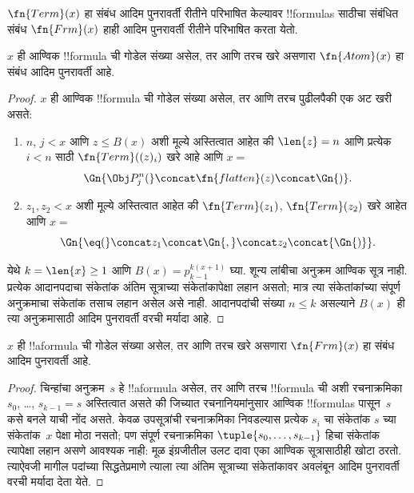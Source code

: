 \documentclass[../../../include/open-logic-section]{subfiles}
\begin{document}

$\fn{Term}(x)$ हा संबंध आदिम पुनरावर्ती रीतीने परिभाषित केल्यावर
!!{formula}s साठीचा संबंधित संबंध $\fn{Frm}(x)$ हाही आदिम
पुनरावर्ती रीतीने परिभाषित करता येतो.

\begin{prop}
$x$ ही आण्विक !!{formula} ची गोडेल संख्या असेल, तर आणि तरच
खरे असणारा $\fn{Atom}(x)$ हा संबंध आदिम पुनरावर्ती आहे.
\end{prop}

\begin{proof}
$x$ ही आण्विक !!{formula} ची गोडेल संख्या असेल, तर आणि तरच
पुढीलपैकी एक अट खरी असते:
\begin{enumerate}
\item $n$, $j < x$ आणि $z \le B(x)$ अशी मूल्ये अस्तित्वात आहेत की
  $\len{z}=n$ आणि प्रत्येक $i < n$ साठी $\fn{Term}((z)_i)$ खरे आहे आणि $x = $
\[
\Gn{\Obj P^n_j(} \concat \fn{flatten}(z) \concat \Gn{)}.
\]
\item $z_1, z_2 < x$ अशी मूल्ये अस्तित्वात आहेत की $\fn{Term}(z_1)$,
  $\fn{Term}(z_2)$ खरे आहेत आणि $x = $
\[
\Gn{{\eq}(} \concat z_1 \concat \Gn{,} \concat z_2 \concat{\Gn{)}}.
\]
\end{enumerate}
येथे $k=\len{x}\ge1$ आणि $B(x)=p_{k-1}^{k(x+1)}$ घ्या.
शून्य लांबीचा अनुक्रम आण्विक सूत्र नाही. प्रत्येक आदानपदाचा संकेतांक
अंतिम सूत्राच्या संकेतांकापेक्षा लहान असतो; मात्र त्या संकेतांकांच्या
संपूर्ण अनुक्रमाचा संकेतांक तसाच लहान असेल असे नाही. आदानपदांची
संख्या $n\le k$ असल्याने $B(x)$ ही त्या अनुक्रमासाठी आदिम पुनरावर्ती
वरची मर्यादा आहे.
\end{proof}

\begin{prop}
$x$ ही !!a{formula} ची गोडेल संख्या असेल, तर आणि तरच
खरे असणारा $\fn{Frm}(x)$ हा संबंध आदिम पुनरावर्ती आहे.
\end{prop}

\begin{proof}
चिन्हांचा अनुक्रम~$s$ हे !!a{formula} असेल, तर आणि तरच
!!{formula} ची अशी रचनाक्रमिका~$s_0$, \dots, $s_{k-1} = s$
अस्तित्वात असते की जिच्यात रचनानियमांनुसार आण्विक !!{formula}s
पासून~$s$ कसे बनले याची नोंद असते. केवळ उपसूत्रांची रचनाक्रमिका
निवडल्यास प्रत्येक $s_i$ चा संकेतांक
$s$ च्या संकेतांक~$x$ पेक्षा मोठा नसतो; पण संपूर्ण रचनाक्रमिका
$\tuple{s_0, \dots, s_{k-1}}$ हिचा संकेतांक त्यापेक्षा लहान
असणे आवश्यक नाही: मूळ इंग्रजीतील उलट दावा एका आण्विक सूत्रासाठीही
खोटा ठरतो. त्याऐवजी मागील पदांच्या सिद्धतेप्रमाणे त्याला
त्या अंतिम सूत्राच्या संकेतांकावर अवलंबून आदिम पुनरावर्ती वरची
मर्यादा देता येते.
\end{proof}
\end{document}
